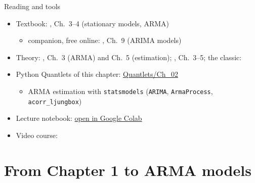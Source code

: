 \begin{frame}{Reading and tools}
\itemsize{\small}
\begin{itemize}
    \item Textbook: , Ch.~3--4 (stationary models, ARMA)
    \begin{itemize}
        \item companion, free online: , Ch.~9 (ARIMA models)
    \end{itemize}
    \item Theory: , Ch.~3 (ARMA) and Ch.~5 (estimation); , Ch.~3--5; the classic: 
    \item Python Quantlets of this chapter: \href{https://github.com/danpele/Time-Series-Analysis/tree/main/Quantlets/Ch_02}{Quantlets/Ch\_02}
    \begin{itemize}
        \item ARMA estimation with \texttt{statsmodels} (\texttt{ARIMA}, \texttt{ArmaProcess}, \texttt{acorr\_ljungbox})
    \end{itemize}
    \item Lecture notebook: \href{\colaburl{notebooks/EN/chapter2_lecture_notebook.ipynb}}{open in Google Colab}
    \item Video course: 
\end{itemize}
\end{frame}


\section{From Chapter 1 to ARMA models}

